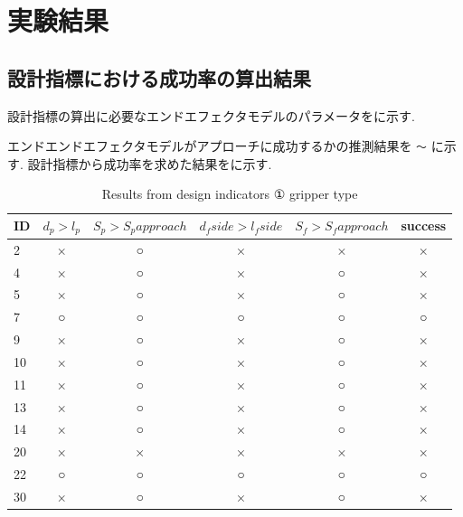 \section{実験結果}

\subsection{設計指標における成功率の算出結果}
設計指標の算出に必要なエンドエフェクタモデルのパラメータをに示す.

\begin{table}[H]
  \begin{center}
    \caption{Parameters of the end effector models}
    \label{Tab:modelparam}
  \end{center}
\end{table}

エンドエンドエフェクタモデルがアプローチに成功するかの推測結果を  \verb|〜|  に示す.
設計指標から成功率を求めた結果をに示す.

\begin{table}[H]
  \begin{center}
    \begin{tabular}{l|ccccc}
      ID & $d_p > l_p$ & $S_p > S_papproach$ & $d_fside > l_fside$ & $S_f > S_fapproach$ & success\\ \hline\hline
      2 & × & ○ & × & × & ×\\
      4 & × & ○ & × & ○ & ×\\
      5 & × & ○ & × & ○ & ×\\
      7 & ○ & ○ & ○ & ○ & ○\\
      9 & × & ○ & × & ○ & ×\\
      10 & × & ○ & × & ○ & ×\\
      11 & × & ○ & × & ○ & ×\\
      13 & × & ○ & × & ○ & ×\\
      14 & × & ○ & × & ○ & ×\\
      20 & × & × & × & × & ×\\
      22 & ○ & ○ & ○ & ○ & ○\\
      30 & × & ○ & × & ○ & ×\\
    \end{tabular}
    \caption{Results from design indicators ① gripper type}
    \label{Tab:resultindicators1}
  \end{center}
\end{table}

